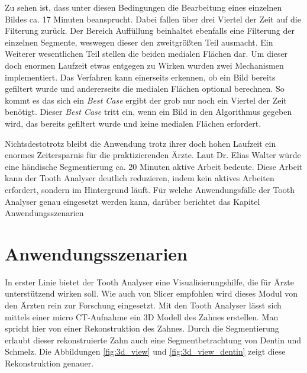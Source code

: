 Zu sehen ist, dass unter diesen Bedingungen die Bearbeitung eines einzelnen
Bildes ca. 17 Minuten beansprucht. Dabei fallen über drei Viertel der Zeit auf
die Filterung zurück. Der Bereich Auffüllung beinhaltet ebenfalls eine Filterung
der einzelnen Segmente, weswegen dieser den zweitgrößten Teil ausmacht. Ein Weiterer
wesentlichen Teil stellen die beiden medialen Flächen dar. Um dieser doch
enormen Laufzeit etwas entgegen zu Wirken wurden zwei Mechanismen implementiert.
Das Verfahren kann einerseits erkennen, ob ein Bild bereits gefiltert wurde und
andererseits die medialen Flächen optional berechnen. So kommt es das sich ein \textit{Best
Case} ergibt der grob nur noch ein Viertel der Zeit benötigt. Dieser \textit{Best
Case} tritt ein, wenn ein Bild in den Algorithmus gegeben wird, das bereits
gefiltert wurde und keine medialen Flächen erfordert.

Nichtsdestotrotz bleibt die Anwendung trotz ihrer doch hohen Laufzeit ein
enormes Zeitersparnis für die praktizierenden Ärzte. Laut Dr. Elias Walter würde
eine händische Segmentierung ca. 20 Minuten aktive Arbeit bedeute. Diese Arbeit
kann der Tooth Analyser deutlich reduzieren, indem kein aktives Arbeiten erfordert,
sondern im Hintergrund läuft. Für welche Anwendungsfälle der Tooth Analyser genau
eingesetzt werden kann, darüber berichtet das Kapitel Anwendungsszenarien

\section{Anwendungsszenarien}
In erster Linie bietet der Tooth Analyser eine Visualisierungshilfe, die für
Ärzte unterstützend wirken soll. Wie auch von Slicer empfohlen wird dieses Modul
von den Ärzten rein zur Forschung eingesetzt. Mit den Tooth Analyser lässt sich
mittels einer micro CT-Aufnahme ein 3D Modell des Zahnes erstellen. Man spricht hier
von einer Rekonstruktion des Zahnes. Durch die Segmentierung erlaubt dieser
rekonstruierte Zahn auch eine Segmentbetrachtung von Dentin und Schmelz. Die Abbildungen
\ref{fig:3d_view} und \ref{fig:3d_view_dentin} zeigt diese Rekonstruktion genauer.

